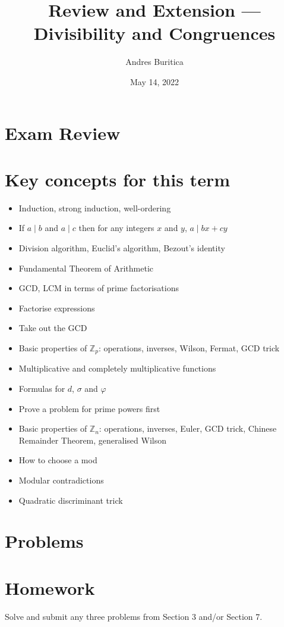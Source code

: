 \documentclass{article}
\title{Review and Extension --- Divisibility and Congruences}
\author{Andres Buritica}
\date{May 14, 2022}
\begin{document}
\maketitle
\section{Exam Review}
\section{Key concepts for this term}
  \begin{itemize}
    \item Induction, strong induction, well-ordering
    \item If $a\mid b$ and $a\mid c$ then for any integers $x$ and $y$, $a\mid
      bx+cy$
    \item Division algorithm, Euclid's algorithm, Bezout's identity
    \item Fundamental Theorem of Arithmetic
    \item GCD, LCM in terms of prime factorisations
    \item Factorise expressions
    \item Take out the GCD
    \item Basic properties of $\mathbb Z_p$: operations, inverses, Wilson,
      Fermat, GCD trick
    \item Multiplicative and completely multiplicative functions
    \item Formulas for $d$, $\sigma$ and $\varphi$
    \item Prove a problem for prime powers first
    \item Basic properties of $\mathbb Z_n$: operations, inverses, 
      Euler, GCD trick, Chinese Remainder Theorem, generalised Wilson
    \item How to choose a mod
    \item Modular contradictions
    \item Quadratic discriminant trick
  \end{itemize}
\section{Problems}
\section{Homework}
  Solve and submit any three problems from Section 3 and/or Section 7.
\newpage
\end{document}

